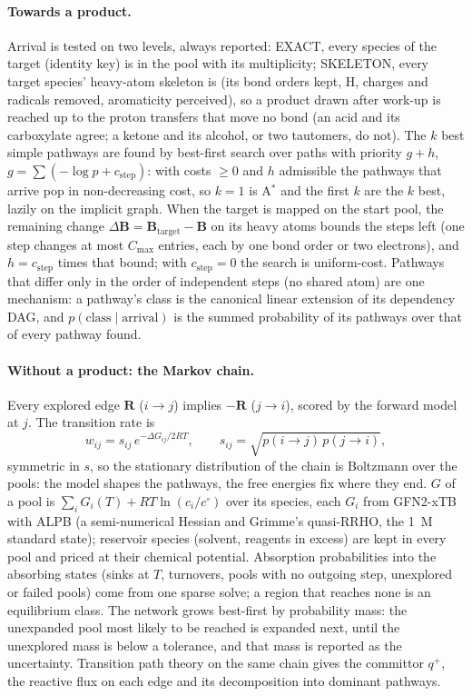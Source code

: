 \documentclass[11pt,a4paper]{article}
\newcommand{\vb}[1]{\bm{#1}}
\begin{document}
\paragraph{Towards a product.} Arrival is tested on two levels, always reported: EXACT, every species of the target (identity key) is in the pool with its multiplicity; SKELETON, every target species' heavy-atom skeleton is (its bond orders kept, H, charges and radicals removed, aromaticity perceived), so a product drawn after work-up is reached up to the proton transfers that move no bond (an acid and its carboxylate agree; a ketone and its alcohol, or two tautomers, do not). The $k$ best simple pathways are found by best-first search over paths with priority $g+h$, $g=\sum(-\log p+c_{\mathrm{step}})$: with costs $\ge0$ and $h$ admissible the pathways that arrive pop in non-decreasing cost, so $k=1$ is A$^*$ and the first $k$ are the $k$ best, lazily on the implicit graph. When the target is mapped on the start pool, the remaining change $\Delta\vb B=\vb B_{\mathrm{target}}-\vb B$ on its heavy atoms bounds the steps left (one step changes at most $C_{\max}$ entries, each by one bond order or two electrons), and $h=c_{\mathrm{step}}$ times that bound; with $c_{\mathrm{step}}=0$ the search is uniform-cost. Pathways that differ only in the order of independent steps (no shared atom) are one mechanism: a pathway's class is the canonical linear extension of its dependency DAG, and $p(\text{class}\mid\text{arrival})$ is the summed probability of its pathways over that of every pathway found.

\paragraph{Without a product: the Markov chain.} Every explored edge $\vb R$ ($i\to j$) implies $-\vb R$ ($j\to i$), scored by the forward model at $j$. The transition rate is
\begin{equation}
w_{ij}=s_{ij}\,e^{-\Delta G_{ij}/2RT},\qquad s_{ij}=\sqrt{p(i\to j)\,p(j\to i)},
\end{equation}
symmetric in $s$, so the stationary distribution of the chain is Boltzmann over the pools: the model shapes the pathways, the free energies fix where they end. $G$ of a pool is $\sum_i G_i(T)+RT\ln(c_i/c^\circ)$ over its species, each $G_i$ from GFN2-xTB with ALPB (a semi-numerical Hessian and Grimme's quasi-RRHO, the 1~M standard state); reservoir species (solvent, reagents in excess) are kept in every pool and priced at their chemical potential. Absorption probabilities into the absorbing states (sinks at $T$, turnovers, pools with no outgoing step, unexplored or failed pools) come from one sparse solve; a region that reaches none is an equilibrium class. The network grows best-first by probability mass: the unexpanded pool most likely to be reached is expanded next, until the unexplored mass is below a tolerance, and that mass is reported as the uncertainty. Transition path theory on the same chain gives the committor $q^+$, the reactive flux on each edge and its decomposition into dominant pathways.
\end{document}
